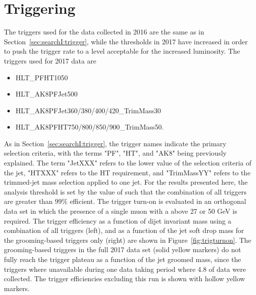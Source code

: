 \clearpage
\section{Triggering}
\label{sec:searchIII:trigger}
The triggers used for the data collected in 2016 are the same as in Section~\ref{sec:searchI:trigger}, while the thresholds in 2017 have increased in order to push the trigger rate to a level acceptable for the increased luminosity. The triggers used for 2017 data are
\begin{itemize}
  \itemsep0em
\item {HLT\_PFHT1050}
\item {HLT\_AK8PFJet500}
\item {HLT\_AK8PFJet360/380/400/420\_TrimMass30}
\item {HLT\_AK8PFHT750/800/850/900\_TrimMass50}.
\end{itemize}
As in Section~\ref{sec:searchI:trigger}, the trigger names indicate the primary selection criteria, with the terms "PF", "HT", and "AK8" being previously explained. The term "JetXXX" refers to the lower value of the \PT selection criteria of the jet, "HTXXX" refers to the HT requirement, and "TrimMassYY" refers to the trimmed-jet mass selection applied to one jet. For the results presented here, the analysis threshold is set by the value of \MVV such that the combination of all triggers are greater than $99 \%$ efficient. The trigger turn-on is evaluated in an orthogonal data set in which the presence of a single muon with a \PT above 27 or 50 GeV is required. The trigger efficiency as a function of dijet invariant mass using a combination of all triggers (left), and as a function of the jet soft drop mass for the grooming-based triggers only (right) are shown in Figure~\ref{fig:trigturnon}. The grooming-based triggers in the full 2017 data set (solid yellow markers) do not fully reach the trigger plateau as a function of the jet groomed mass, since the triggers where unavailable during one data taking period where 4.8 \fbinv of data were collected. The trigger efficiencies excluding this run is shown with hollow yellow markers.

